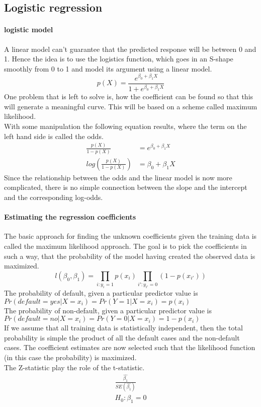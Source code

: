 \documentclass[../document.tex]{subfiles}
\begin{document}
	\subsection{Logistic regression}
	\paragraph{logistic model}
	A linear model can't guarantee that the predicted response will be between 0 and 1. Hence the idea is to use the logistics function, which goes in an S-shape smoothly from 0 to 1 and model its argument using a linear model.
	\begin{equation}
		p(X)=\frac{e^{\beta_{0}+\beta_{1}X}}{1+e^{\beta_{0}+\beta_{1}X}}
	\end{equation}
	One problem that is left to solve is, how the coefficient can be found so that this will generate a meaningful curve. This will be based on a scheme called maximum likelihood.\\
	With some manipulation the following equation results, where the term on the left hand side is called the odds.
	\begin{equation}
	\begin{split}
		\frac{p(X)}{1-p(X)}&=e^{\beta_{0}+\beta_{1}X}\\
		log(\frac{p(X)}{1-p(X)})&=\beta_{0}+\beta_{1}X
	\end{split}
	\end{equation}
	Since the relationship between the odds and the linear model is now more complicated, there is no simple connection between the slope and the intercept and the corresponding log-odds.
	\paragraph{Estimating the regression coefficients}
	The basic approach for finding the unknown coefficients given the training data is called the maximum likelihood approach. The goal is to pick the coefficients in such a way, that the probability of the model having created the observed data is maximized.
	\begin{equation}
		l(\beta_{0},\beta_{1})=\prod_{i:y_{i}=1}p(x_{i})\prod_{i':y_{i'}=0}(1-p(x_{i'}))
	\end{equation}
	The probability of default, given a particular predictor value is \(Pr(default=yes|X=x_{i})=Pr(Y=1|X=x_{i})=p(x_{i})\)\\
	The probability of non-default, given a particular predictor value is \(Pr(default=no|X=x_{i})=Pr(Y=0|X=x_{i})=1-p(x_{i})\)\\
	If we assume that all training data is statistically independent, then the total probability is simple the product of all the default cases and the non-default cases. The coefficient estimates are now selected such that the likelihood function (in this case the probability) is maximized.\\
	The Z-statistic play the role of the t-statistic.
	\begin{equation}
	\begin{split}
		\frac{\hat{\beta_{1}}}{SE(\hat{\beta_{1}})}\\
		H_{0}:\beta_{1}=0
	\end{split}
	\end{equation}
\end{document}
